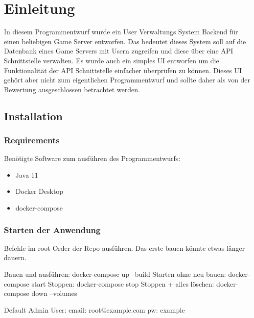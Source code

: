 \chapter{Einleitung}

In diesem Programmentwurf wurde ein User Verwaltungs System Backend für einen beliebigen Game Server entworfen.
Das bedeutet dieses System soll auf die Datenbank eines Game Servers mit Usern zugreifen und diese über eine API Schnittstelle verwalten.
Es wurde auch ein simples UI entworfen um die Funktionalität der API Schnittstelle einfacher überprüfen zu können.
Dieses UI gehört aber nicht zum eigentlichen Programmentwurf und sollte daher als von der Bewertung ausgeschlossen betrachtet werden.

\section{Installation}

\subsection{Requirements}

Benötigte Software zum ausführen des Programmentwurfs:

\begin{itemize}
    \item Java 11
    \item Docker Desktop
    \item docker-compose
\end{itemize}

\subsection{Starten der Anwendung}
Befehle im root Order der Repo ausführen.
Das erste bauen könnte etwas länger dauern.

Bauen und ausführen: docker-compose up --build
\newline
Starten ohne neu bauen: docker-compose start
\newline
Stoppen: docker-compose stop
\newline
Stoppen + alles löschen: docker-compose down --volumes
\newline

Default Admin User: email: root@example.com pw: example




